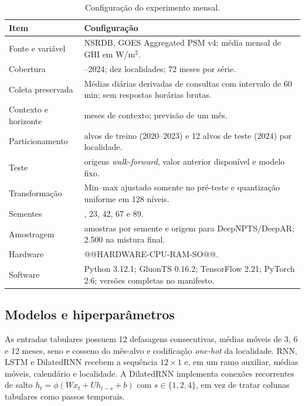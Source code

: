 \documentclass[10pt,conference,a4paper]{IEEEtran}
\begin{document}
\begin{table}[!t]
\centering
\caption{Configuração do experimento mensal.}
\label{tab:setup}
\small
\setlength{\tabcolsep}{3.5pt}
\renewcommand{\arraystretch}{1.05}
\begin{tabular}{>{\raggedright\arraybackslash}p{2.05cm}>{\raggedright\arraybackslash}p{5.95cm}}
\toprule
\textbf{Item} & \textbf{Configuração} \\
\midrule
Fonte e variável & NSRDB, GOES Aggregated PSM v4; média mensal de GHI em W/m$^2$. \\
Cobertura & 2019--2024; dez localidades; 72 meses por série. \\
Coleta preservada & Médias diárias derivadas de consultas com intervalo de 60 min; sem respostas horárias brutas. \\
Contexto e horizonte & 12 meses de contexto; previsão de um mês. \\
Particionamento & 48 alvos de treino (2020--2023) e 12 alvos de teste (2024) por localidade. \\
Teste & 12 origens \textit{walk-forward}, valor anterior disponível e modelo fixo. \\
Transformação & Min--max ajustado somente no pré-teste e quantização uniforme em 128 níveis. \\
Sementes & 11, 23, 42, 67 e 89. \\
Amostragem & 500 amostras por semente e origem para DeepNPTS/DeepAR; 2.500 na mistura final. \\
Hardware & @@HARDWARE-CPU-RAM-SO@@. \\
Software & Python 3.12.1; GluonTS 0.16.2; TensorFlow 2.21; PyTorch 2.6; versões completas no manifesto. \\
\bottomrule
\end{tabular}
\end{table}

\subsection{Modelos e hiperparâmetros}

As entradas tabulares possuem 12 defasagens consecutivas, médias móveis de 3,
6 e 12 meses, seno e cosseno do mês-alvo e codificação \textit{one-hot} da
localidade. RNN, LSTM e DilatedRNN recebem a sequência $12\times1$ e, em um ramo
auxiliar, médias móveis, calendário e localidade. A DilatedRNN implementa
conexões recorrentes de salto $h_t=\phi(Wx_t+Uh_{t-s}+b)$ com $s\in\{1,2,4\}$,
em vez de tratar colunas tabulares como passos temporais.
\end{document}
